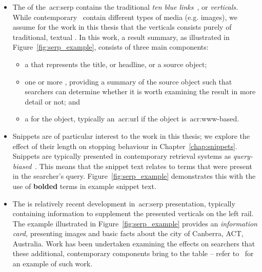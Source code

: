 \begin{itemize}
    
    \item{The  of the~\gls{acr:serp} contains the traditional \emph{ten blue links}~\citep{hearst2009_search}, or \emph{verticals.} While contemporary~ contain different types of media (e.g. images), we assume for the work in this thesis that the verticals consists purely of traditional, textual . In this work, a result summary, as illustrated in Figure~\ref{fig:serp_example}, consists of three main components:}
    
    \begin{itemize}
        \item{a  that represents the title, or headline, or a source object;}
        \item{one or more , providing a summary of the source object such that searchers can determine whether it is worth examining the result in more detail or not; and}
        \item{a  for the object, typically an~\gls{acr:url} if the object is~\gls{acr:www}-based.}
    \end{itemize}
    
    \item[]{Snippets are of particular interest to the work in this thesis; we explore the effect of their length on stopping behaviour in Chapter~\ref{chap:snippets}. Snippets are typically presented in contemporary retrieval systems as \emph{query-biased}~\citep{tombros1998query_biased}. This means that the snippet text relates to terms that were present in the searcher's query. Figure~\ref{fig:serp_example} demonstrates this with the use of \textbf{bolded} terms in example snippet text.}
    
    \item{The  is relatively recent development in~\gls{acr:serp} presentation, typically containing information to supplement the presented verticals on the left rail. The example illustrated in Figure~\ref{fig:serp_example} provides an \emph{information card,} presenting images and basic facts about the city of Canberra, ACT, Australia. Work has been undertaken examining the effects on searchers that these additional, contemporary components bring to the table -- refer to~\cite{bota2016information_cards} for an example of such work.}
    
\end{itemize}

